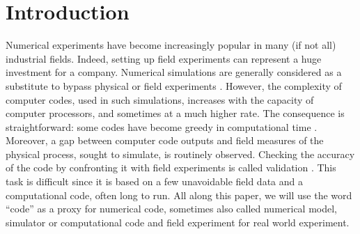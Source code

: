 \documentclass[soumission]{jsfds}
\edef\hc{\string: }
\begin{document}
\begin{frontmatter}
\begin{altabstract}
\end{altabstract}

  \begin{motscles}
  \end{motscles}

  \begin{motsclesalter}
  \end{motsclesalter}
  
  \begin{AMSclass}
  \end{AMSclass}
 
\end{frontmatter}


\section{Introduction}


Numerical experiments have become increasingly popular in many (if not all) industrial fields. Indeed, setting up field experiments can represent a huge investment for a company. Numerical simulations are generally considered as a substitute to bypass physical or field experiments \citep{santner2013,fang2005}. However, the complexity of computer codes, used in such simulations, increases with the capacity of computer processors, and sometimes at a much higher rate. The consequence is straightforward\hc some codes have become greedy in computational time \citep{sacks1989}. Moreover, a gap between computer code outputs and field measures of the physical process, sought to simulate, is routinely observed. 
Checking the accuracy of the code by confronting it with field experiments is called validation \citep{bayarri2007}. This task is difficult since it is based on a few unavoidable field data and a computational code, often long to run. 
All along this paper, we will use the word ``code'' as a proxy for numerical code, sometimes also called numerical model, simulator or computational code and field experiment for real world experiment.
\newline
\end{document}
